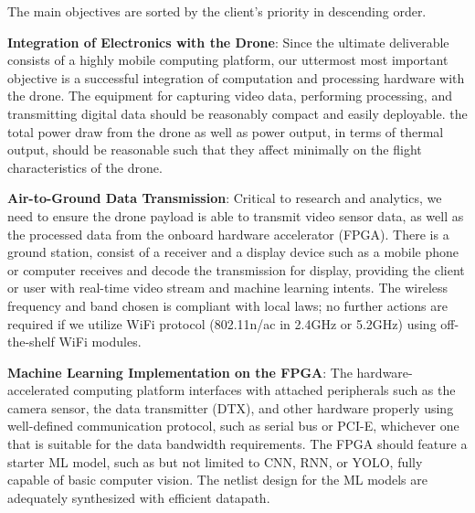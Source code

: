 The main objectives are sorted by the client's priority in descending order.

\textbf{Integration of Electronics with the Drone}:
Since the ultimate deliverable consists of a highly mobile computing platform,
our uttermost most important objective is a successful integration of computation and processing hardware with the drone.
The equipment for capturing video data, performing processing, and transmitting digital data should be reasonably compact and easily deployable.
the total power draw from the drone as well as power output, in terms of thermal output, should be reasonable such that they affect minimally
on the flight characteristics of the drone.

\textbf{Air-to-Ground Data Transmission}:
Critical to research and analytics, we need to ensure the drone payload is able to transmit video sensor data, as well as the processed data
from the onboard hardware accelerator (FPGA). There is a ground station, consist of a receiver and a display device such as a mobile phone or 
computer receives and decode the transmission for display, providing the client or user with real-time video stream and machine learning intents.
The wireless frequency and band chosen is compliant with local laws; no further actions are required if we utilize WiFi protocol (802.11n/ac in 2.4GHz or 5.2GHz)
using off-the-shelf WiFi modules.

\textbf{Machine Learning Implementation on the FPGA}:
The hardware-accelerated computing platform interfaces with attached peripherals such as the camera sensor, the data transmitter (DTX), and other hardware properly
using well-defined communication protocol, such as serial bus or PCI-E, whichever one that is suitable for the data bandwidth requirements. 
The FPGA should feature a starter ML model, such as but not limited to CNN, RNN, or YOLO, fully capable of basic computer vision.
The netlist design for the ML models are adequately synthesized with efficient datapath.
